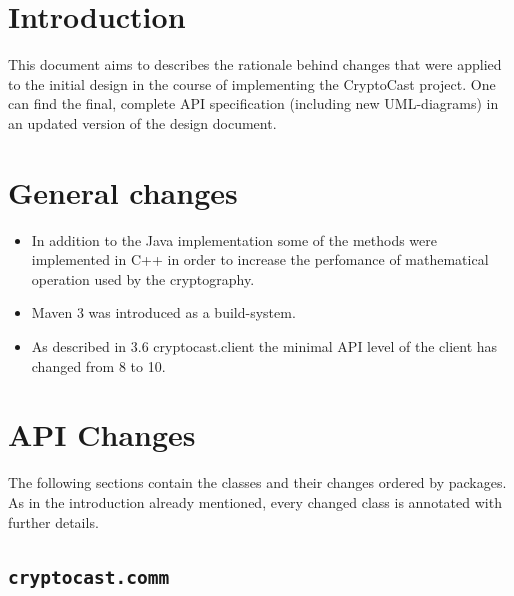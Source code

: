 \documentclass[a4paper,10pt]{scrartcl}
\title{\doctitle}
\author{\authorName}
\date{\today}
\begin{document}

\tableofcontents
\clearpage

\section{Introduction}
This document aims to describes the rationale behind changes that were applied to the initial design
in the course of implementing the CryptoCast project. One can find the final, complete API specification (including new UML-diagrams)
in an updated version of the design document.

\section{General changes}
\begin{itemize}
   \item In addition to the Java implementation some of the methods were implemented in C++ in order to increase the perfomance
	of mathematical operation used by the cryptography.
   \item Maven 3 was introduced as a build-system.
   \item As described in 3.6 cryptocast.client the minimal API level of the client has changed from 8 to 10.
\end{itemize}

\section{API Changes}
The following sections contain the classes and their changes ordered by packages. As in the introduction already mentioned, every
changed class is annotated with further details.
\subsection{\lstinline|cryptocast.comm|}
\end{document}

